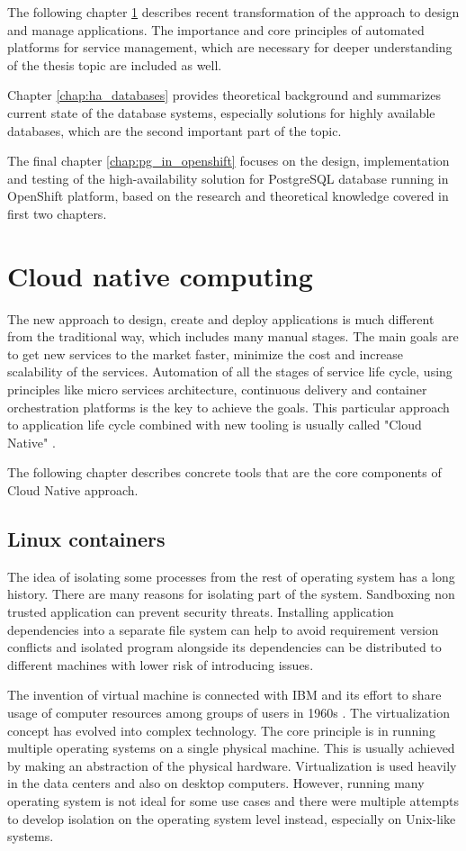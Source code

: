 \documentclass[
  digital, %
  twoside, %
  table,   %
  lof,     %
  lot,     %
]{fithesis3}
\begin{document}
The following chapter \ref{chap:cloud_native} describes recent transformation of the approach to design and manage applications. The importance and core principles of automated platforms for service management, which are necessary for deeper understanding of the thesis topic are included as well.

Chapter \ref{chap:ha_databases} provides theoretical background and summarizes current state of the database systems, especially solutions for highly available databases, which are the second important part of the topic.

The final chapter \ref{chap:pg_in_openshift} focuses on the design, implementation and testing of the high-availability solution for PostgreSQL database running in OpenShift platform, based on the research and theoretical knowledge covered in first two chapters.

\chapter{Cloud native computing} \label{chap:cloud_native}
The new approach to design, create and deploy applications is much different from the traditional way, which includes many manual stages. The main goals are to get new services to the market faster, minimize the cost and increase scalability of the services. Automation of all the stages of service life cycle, using principles like micro services architecture, continuous delivery and container orchestration platforms is the key to achieve the goals. This particular approach to application life cycle combined with new tooling is usually called "Cloud Native" \cite{cloud_native}.

The following chapter describes concrete tools that are the core components of Cloud Native approach.

\section{Linux containers} \label{sec:containers}
The idea of isolating some processes from the rest of operating system has a long history. There are many reasons for isolating part of the system. Sandboxing non trusted application can prevent security threats. Installing application dependencies into a separate file system can help to avoid requirement version conflicts and isolated program alongside its dependencies can be distributed to different machines with lower risk of introducing issues.

The invention of virtual machine is connected with IBM and its effort to share usage of computer resources among groups of users in 1960s \cite{vm_history}. The virtualization concept has evolved into complex technology. The core principle is in running multiple operating systems on a single physical machine. This is usually achieved by making an abstraction of the physical hardware. Virtualization is used heavily in the data centers and also on desktop computers. However, running many operating system is not ideal for some use cases and there were multiple attempts to develop isolation on the operating system level instead, especially on Unix-like systems.
\end{document}
